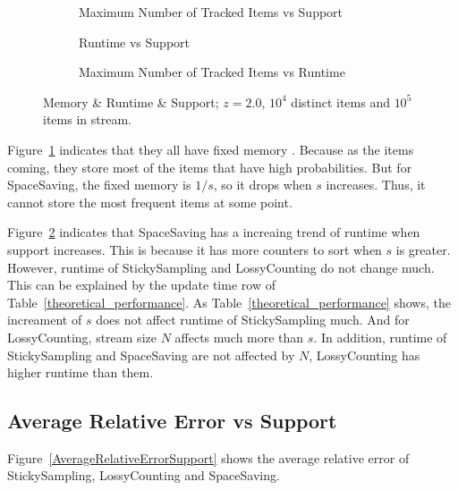 \documentclass[10pt]{article}
\begin{document}
\begin{figure}[!t]
      \centering
      \begin{subfigure}[b]{0.5\textwidth}
          \centering
           \caption{Maximum Number of Tracked Items vs Support}
           \label{MaxTrackedSupport}
     \end{subfigure}

     \begin{subfigure}[b]{0.5\textwidth}
            \centering
            \caption{Runtime vs Support}
           \label{RuntimeSupport}
     \end{subfigure}
     
     \begin{subfigure}[b]{0.5\textwidth}
            \centering
            \caption{Maximum Number of Tracked Items vs Runtime}
            \label{MaxTrackedRuntime}
      \end{subfigure}
     \caption{Memory \& Runtime \& Support; $z=2.0$, $10^{4}$ distinct items and $10^{5}$ items in stream.}  
      \label{MemoryRuntimeSupport}
 \end{figure}

 Figure~\ref{MaxTrackedSupport} indicates that they all have fixed memory .
 Because as the items coming, they store most of the items that have high probabilities.
But for SpaceSaving, the fixed memory is $1/s$, so it drops when $s$ increases. 
Thus, it cannot store the most frequent items at some point. 

Figure~\ref{RuntimeSupport} indicates that SpaceSaving has a increaing trend of runtime when
support increases. This is because it has more counters to sort when $s$ is greater.
However, runtime of StickySampling and LossyCounting do not change much.
This can be explained by the update time row of Table~\ref{theoretical_performance}.
As Table~\ref{theoretical_performance} shows, the increament of $s$ does not 
affect runtime of StickySampling much. And for LossyCounting, stream size $N$
affects much more than $s$. In addition, runtime of StickySampling and SpaceSaving are not affected by $N$, 
LossyCounting has higher runtime than them.

\subsection{Average Relative Error vs Support}
Figure~\ref{AverageRelativeErrorSupport} shows the average relative error of StickySampling, LossyCounting and SpaceSaving.
\end{document}
